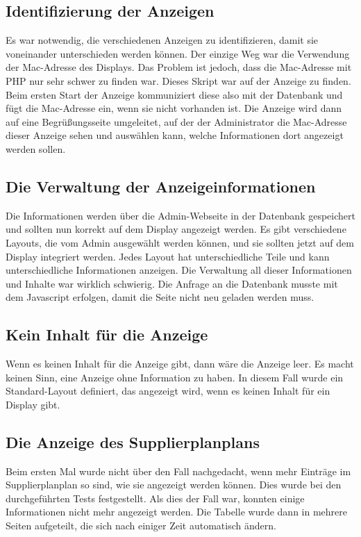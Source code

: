 \subsection{Identifizierung der Anzeigen}

Es war notwendig, die verschiedenen Anzeigen zu identifizieren, damit sie voneinander unterschieden werden können. Der einzige Weg war die Verwendung der Mac-Adresse des Displays. Das Problem ist jedoch, dass die Mac-Adresse mit PHP nur sehr schwer zu finden war. Dieses Skript war auf der Anzeige zu finden. Beim ersten Start der Anzeige kommuniziert diese also mit der Datenbank und fügt die Mac-Adresse ein, wenn sie nicht vorhanden ist. Die Anzeige wird dann auf eine Begrüßungsseite umgeleitet, auf der der Administrator die Mac-Adresse dieser Anzeige sehen und auswählen kann, welche Informationen dort angezeigt werden sollen. 

\subsection{Die Verwaltung der Anzeigeinformationen}


Die Informationen werden über die Admin-Webseite in der Datenbank gespeichert und sollten nun korrekt auf dem Display angezeigt werden. Es gibt verschiedene Layouts, die vom Admin ausgewählt werden können, und sie sollten jetzt auf dem Display integriert werden. Jedes Layout hat unterschiedliche Teile und kann unterschiedliche Informationen anzeigen. Die Verwaltung all dieser Informationen und Inhalte war wirklich schwierig. Die Anfrage an die Datenbank musste mit dem Javascript erfolgen, damit die Seite nicht neu geladen werden muss. 

\subsection{Kein Inhalt für die Anzeige}

Wenn es keinen Inhalt für die Anzeige gibt, dann wäre die Anzeige leer. Es macht keinen Sinn, eine Anzeige ohne Information zu haben. In diesem Fall wurde ein Standard-Layout definiert, das angezeigt wird, wenn es keinen Inhalt für ein Display gibt.

\subsection{Die Anzeige des Supplierplanplans}


Beim ersten Mal wurde nicht über den Fall nachgedacht, wenn mehr Einträge im Supplierplanplan so sind, wie sie angezeigt werden können. Dies wurde bei den durchgeführten Tests festgestellt. Als dies der Fall war, konnten einige Informationen nicht mehr angezeigt werden. Die Tabelle wurde dann in mehrere Seiten aufgeteilt, die sich nach einiger Zeit automatisch ändern. 

